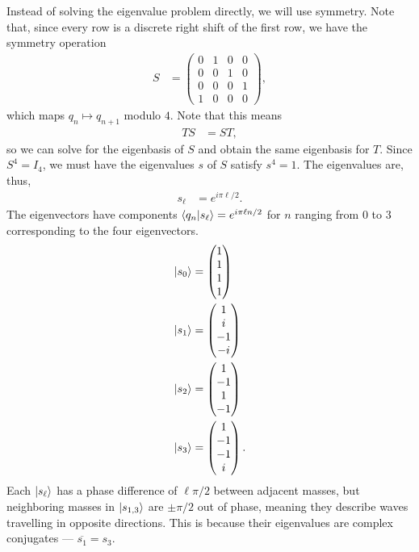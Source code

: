\documentclass[10pt]{mypackage}
\begin{document}
\begin{example}[A Bracelet]
  Instead of solving the eigenvalue problem directly, we will use symmetry. Note that, since every row is a discrete right shift of the first row, we have the symmetry operation
  \begin{align*}
    S &= \begin{pmatrix}0 & 1 & 0 & 0 \\ 0 & 0 & 1 & 0 \\ 0 & 0 & 0 & 1 \\ 1 & 0 & 0 & 0\end{pmatrix},
  \end{align*}
  which maps $q_{n}\mapsto q_{n+1}$ modulo $4$. Note that this means
  \begin{align*}
    TS &= ST,
  \end{align*}
  so we can solve for the eigenbasis of $S$ and obtain the same eigenbasis for $T$. Since $S^{4} = I_4$, we must have the eigenvalues $s$ of $S$ satisfy $s^{4} = 1$. The eigenvalues are, thus,
  \begin{align*}
    s_{\ell} &= e^{i\pi \ell/2}.
  \end{align*}
  The eigenvectors have components $\braket{q_n}{s_{\ell}} = e^{i\pi \ell n/2}$ for $n$ ranging from $0$ to $3$ corresponding to the four eigenvectors.
  \begin{align*}
    \ket{s_0} &= \begin{pmatrix}1\\1\\1\\1\end{pmatrix}\\
    \ket{s_1} &= \begin{pmatrix}1\\i\\-1\\-i\end{pmatrix}\\
    \ket{s_2} &= \begin{pmatrix}1\\-1\\1\\-1\end{pmatrix}\\
    \ket{s_3} &= \begin{pmatrix}1\\-1\\-1\\i\end{pmatrix}.
  \end{align*}
  Each $\ket{s_{\ell}}$ has a phase difference of $\ell \pi/2$ between adjacent masses, but neighboring masses in $\ket{s_{1,3}}$ are $\pm \pi/2$ out of phase, meaning they describe waves travelling in opposite directions. This is because their eigenvalues are complex conjugates --- $\overline{s_1} = s_3$.\newline


\end{example}
\end{document}
